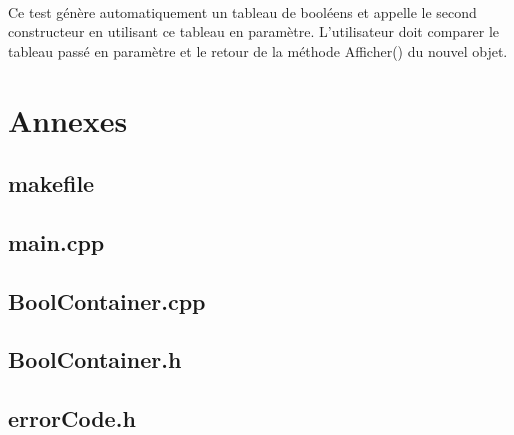\documentclass[a4paper, 12pts]{article}
\begin{document}
\paragraph{}
Ce test génère automatiquement un tableau de booléens et appelle le second constructeur en utilisant ce tableau en paramètre. L'utilisateur doit comparer le tableau passé en paramètre et le retour de la méthode Afficher() du nouvel objet.

\pagebreak

\section{Annexes}

\subsection{makefile}

\pagebreak

\subsection{main.cpp}

\pagebreak

\subsection{BoolContainer.cpp}

\pagebreak

\subsection{BoolContainer.h}

\pagebreak

\subsection{errorCode.h}

\pagebreak
\end{document}

